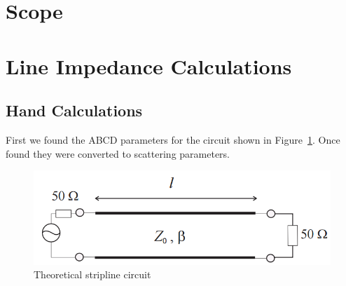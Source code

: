 \documentclass{paper}
\begin{document}
\newpage
\section{Scope}


\newpage
\section{Line Impedance Calculations}
\subsection{Hand Calculations}
First we found the ABCD parameters for the circuit shown in Figure~\ref{fig:theoretical_circuit}. Once found they were converted to scattering parameters.

\begin{figure}[H]
	\centering
	\includegraphics[scale=0.5]{IMG/theoretical_circuit}
	\caption{Theoretical stripline circuit}
	\label{fig:theoretical_circuit}
\end{figure}
\end{document}
